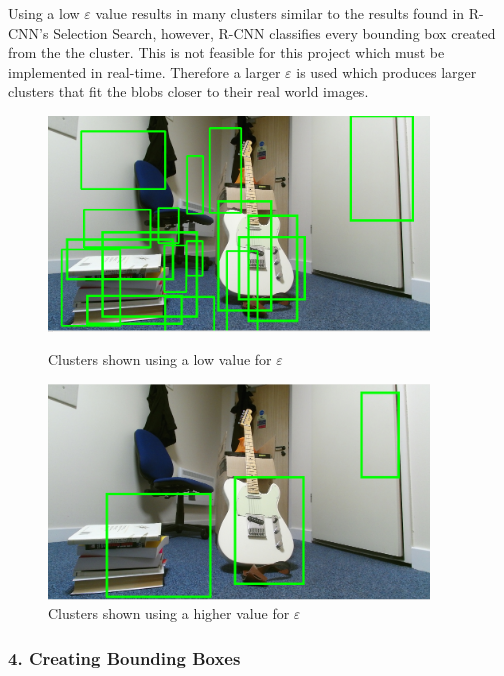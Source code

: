 \documentclass{mproj}
\begin{document}
 
Using a low $\varepsilon$  value results in many clusters similar to the results found in R-CNN's Selection Search, however, R-CNN classifies every bounding box created from the the cluster. This is not feasible for this project which must be implemented in real-time. Therefore a larger $\varepsilon$ is used which produces larger clusters that fit the blobs closer to their real world images.


\begin{figure}
    \centering
    \begin{minipage}{0.45\textwidth}
        \centering
        \includegraphics[width=0.9\textwidth]{images/many.png} %
        \caption{Clusters shown using a low value for $\varepsilon$}
    \end{minipage}\hfill
    \begin{minipage}{0.45\textwidth}
        \centering
        \includegraphics[width=0.9\textwidth]{images/clusters.png} %
        \caption{Clusters shown using a higher value for $\varepsilon$}
    \end{minipage}
\end{figure}

\subsubsection{4. Creating Bounding Boxes}
\end{document}
